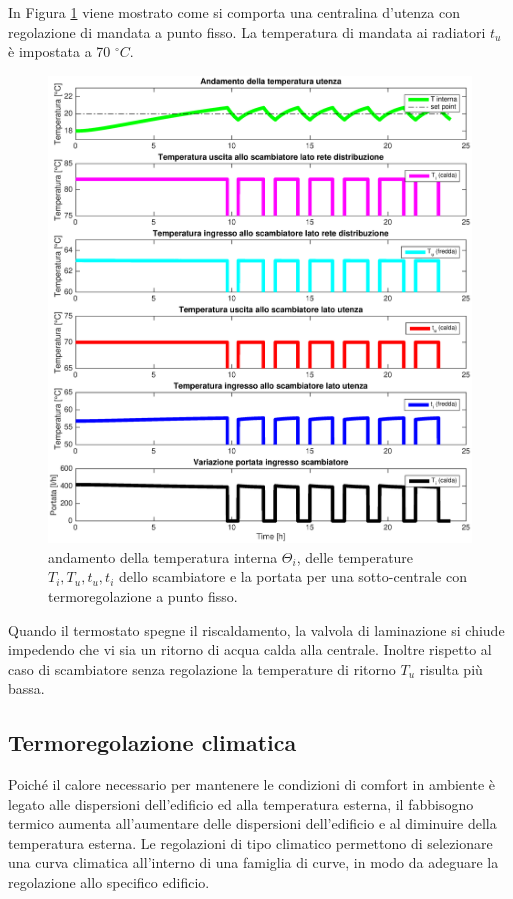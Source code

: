 \documentclass[laurea,oneside,11pt]{USiena_tesiLM3}
\begin{document}
In Figura \ref{fig:reg_mandata} viene mostrato come si comporta una centralina d'utenza con regolazione di mandata a punto fisso. La temperatura di mandata ai radiatori $t_u$ è impostata a 70  $^{\circ}C$.  

\begin{figure}[!ht]
\centering
\includegraphics[width=\textwidth]{figure/reg_mandata} 
\caption{andamento della temperatura interna $\Theta_i$, delle temperature $T_i, T_u, t_u, t_i$ dello scambiatore e la portata per una sotto-centrale con termoregolazione a punto fisso.}
\label{fig:reg_mandata}
\end{figure}

Quando il termostato spegne il riscaldamento, la valvola di laminazione si chiude impedendo che vi sia un ritorno di acqua calda alla centrale. Inoltre rispetto al caso di scambiatore senza regolazione la temperature di ritorno $T_u$ risulta più bassa.


\subsection{Termoregolazione climatica}
Poiché il calore necessario per mantenere le condizioni di comfort in ambiente è legato alle dispersioni dell'edificio ed alla temperatura esterna, il fabbisogno termico aumenta all'aumentare delle dispersioni dell'edificio e al diminuire della temperatura esterna. Le regolazioni di tipo climatico permettono di selezionare una curva climatica all'interno di una famiglia di curve, in modo da adeguare la regolazione allo specifico edificio. 
\end{document}
